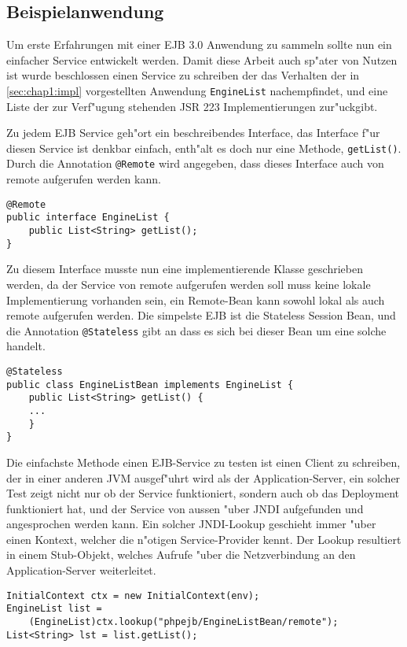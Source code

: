 \subsection{Beispielanwendung}
\label{sec:chap2:infra:example}

Um erste Erfahrungen mit einer EJB 3.0 Anwendung zu sammeln sollte nun ein einfacher Service entwickelt werden.
Damit diese Arbeit auch sp"ater von Nutzen ist wurde beschlossen einen Service zu schreiben der das Verhalten
der in \ref{sec:chap1:impl} vorgestellten Anwendung \texttt{EngineList} nachempfindet, und eine Liste der zur Verf"ugung 
stehenden JSR 223 Implementierungen zur"uckgibt.

Zu jedem EJB Service geh"ort ein beschreibendes Interface, das Interface f"ur diesen Service ist denkbar einfach,
enth"alt es doch nur eine Methode, \texttt{getList()}. Durch die Annotation \texttt{@Remote} wird angegeben, dass dieses
Interface auch von remote aufgerufen werden kann.
\begin{lstlisting}[caption=Testservice Interface]
@Remote
public interface EngineList {
    public List<String> getList();
}
\end{lstlisting}
Zu diesem Interface musste nun eine implementierende Klasse geschrieben werden, da der Service von remote aufgerufen
werden soll muss keine lokale Implementierung vorhanden sein, ein Remote-Bean kann sowohl lokal als auch remote
aufgerufen werden. Die simpelste EJB ist die Stateless Session Bean, und die Annotation \texttt{@Stateless} gibt an
dass es sich bei dieser Bean um eine solche handelt.
\begin{lstlisting}[caption=Testservice Bean]
@Stateless
public class EngineListBean implements EngineList {
    public List<String> getList() {
    ...
    }
}
\end{lstlisting}
Die einfachste Methode einen EJB-Service zu testen ist einen Client zu schreiben, der in einer anderen JVM
ausgef"uhrt wird als der Application-Server, ein solcher Test zeigt nicht nur ob der Service funktioniert,
sondern auch ob das Deployment funktioniert hat, und der Service von aussen "uber JNDI aufgefunden und angesprochen
werden kann. Ein solcher JNDI-Lookup geschieht immer "uber einen Kontext, welcher die n"otigen Service-Provider
kennt. Der Lookup resultiert in einem Stub-Objekt, welches Aufrufe "uber die Netzverbindung an den Application-Server
weiterleitet.
\begin{lstlisting}[caption=Testservice Client]
InitialContext ctx = new InitialContext(env);
EngineList list = 
    (EngineList)ctx.lookup("phpejb/EngineListBean/remote");
List<String> lst = list.getList();
\end{lstlisting}

